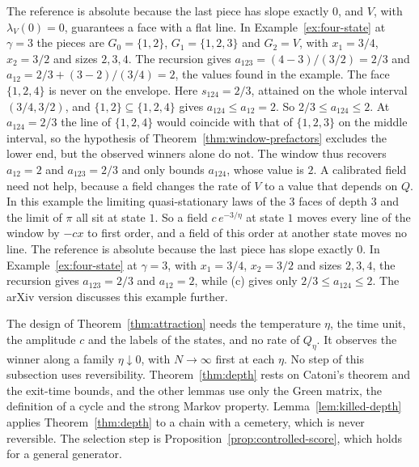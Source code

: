 \ifarxivbuild
The reference is absolute because the last piece has slope exactly $0$, and
$V$, with $\lambda_V(0)=0$, guarantees a face with a flat line. In
Example~\ref{ex:four-state} at $\gamma=3$ the pieces are $G_0=\{1,2\}$,
$G_1=\{1,2,3\}$ and $G_2=V$, with $x_1=3/4$, $x_2=3/2$ and sizes
$2,3,4$. The recursion gives $a_{123}=(4-3)/(3/2)=2/3$ and
$a_{12}=2/3+(3-2)/(3/4)=2$, the values found in the example. The face
$\{1,2,4\}$ is never on the envelope. Here $s_{124}=2/3$, attained on the
whole interval $(3/4,3/2)$, and $\{1,2\}\subseteq\{1,2,4\}$ gives
$a_{124}\le a_{12}=2$. So $2/3\le a_{124}\le2$. At $a_{124}=2/3$ the
line of $\{1,2,4\}$ would coincide with that of $\{1,2,3\}$ on the middle
interval, so the hypothesis of Theorem~\ref{thm:window-prefactors} excludes
the lower end, but the observed winners alone do not. The window thus recovers
$a_{12}=2$ and $a_{123}=2/3$ and only bounds $a_{124}$, whose value is $2$.
A calibrated field need not help, because a field changes the rate of
$V$ to a value that depends on $Q$. In this example the limiting quasi-stationary
laws of the 3 faces of depth $3$ and the limit of $\pi$ all sit at state $1$. So a
field $c\,e^{-3/\eta}$ at state $1$ moves every line of the window by $-cx$ to first
order, and a field of this order at another state moves no line.
\else
The reference is absolute because the last piece has slope exactly $0$. In
Example~\ref{ex:four-state} at $\gamma=3$, with $x_1=3/4$, $x_2=3/2$ and sizes $2,3,4$, the
recursion gives $a_{123}=2/3$ and $a_{12}=2$, while (c) gives only $2/3\le a_{124}\le2$. The
arXiv version discusses this example further.
\fi

\begin{remark}\label{rem:design}
The design of Theorem~\ref{thm:attraction} needs the temperature $\eta$, the time
unit, the amplitude $c$ and the labels of the states, and no rate of $Q_\eta$. It
observes the winner along a family $\eta\downarrow0$, with $N\to\infty$ first at
each $\eta$. No step of this subsection uses reversibility. Theorem~\ref{thm:depth} rests on
Catoni's theorem and the exit-time bounds, and the other lemmas use only the Green
matrix, the definition of a cycle and the strong Markov property.
Lemma~\ref{lem:killed-depth} applies Theorem~\ref{thm:depth} to a chain with a cemetery,
which is never reversible. The selection step is Proposition~\ref{prop:controlled-score},
which holds for a general generator.
\end{remark}
